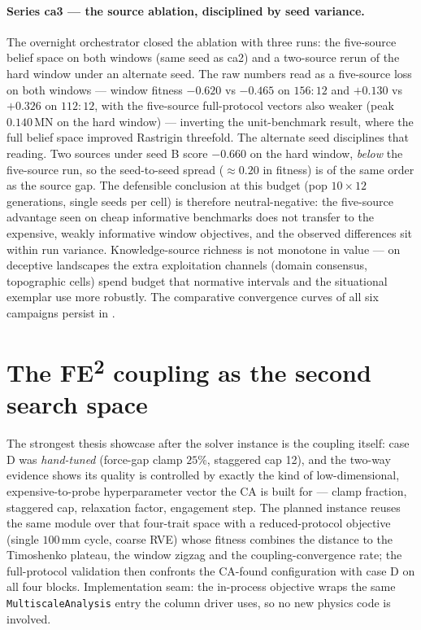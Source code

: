 \paragraph{Series ca3 --- the source ablation, disciplined by seed
variance.} The overnight orchestrator closed the ablation with three
runs: the five-source belief space on both windows (same seed as ca2)
and a two-source rerun of the hard window under an alternate seed.
The raw numbers read as a five-source loss on both windows --- window
fitness $-0.620$ vs $-0.465$ on $156{:}12$ and $+0.130$ vs $+0.326$
on $112{:}12$, with the five-source full-protocol vectors also weaker
(peak $0.140$\,MN on the hard window) --- inverting the unit-benchmark
result, where the full belief space improved Rastrigin threefold. The
alternate seed disciplines that reading. Two sources under seed B
score $-0.660$ on the hard window, \emph{below} the five-source run,
so the seed-to-seed spread ($\approx 0.20$ in fitness) is of the same
order as the source gap. The defensible conclusion at this budget
(pop $10 \times 12$ generations, single seeds per cell) is therefore
neutral-negative: the five-source advantage seen on cheap informative
benchmarks does not transfer to the expensive, weakly informative
window objectives, and the observed differences sit within run
variance. Knowledge-source richness is not monotone in value --- on
deceptive landscapes the extra exploitation channels (domain
consensus, topographic cells) spend budget that normative intervals
and the situational exemplar use more robustly. The comparative
convergence curves of all six campaigns persist in
.

\section{The FE\textsuperscript{2} coupling as the second search
space}
\label{sec:ca-fe2}

The strongest thesis showcase after the solver instance is the
coupling itself: case D was \emph{hand-tuned} (force-gap clamp
$25\%$, staggered cap 12), and the two-way evidence shows its
quality is controlled by exactly the kind of low-dimensional,
expensive-to-probe hyperparameter vector the CA is built for ---
clamp fraction, staggered cap, relaxation factor, engagement step.
The planned instance reuses the same module over that four-trait
space with a reduced-protocol objective (single $100$\,mm cycle,
coarse RVE) whose fitness combines the distance to the Timoshenko
plateau, the window zigzag and the coupling-convergence rate; the
full-protocol validation then confronts the CA-found configuration
with case D on all four blocks. Implementation seam: the in-process
objective wraps the same \texttt{MultiscaleAnalysis} entry the column
driver uses, so no new physics code is involved.

